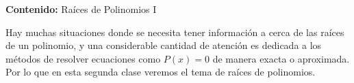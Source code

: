 {\Large\textbf{Contenido:} Raíces de Polinomios I}

Hay muchas situaciones donde se necesita tener información a cerca de las raíces de un polinomio, y una considerable cantidad de atención es dedicada a los métodos de resolver ecuaciones como $P(x) = 0$ de manera exacta o aproximada.
Por lo que en esta segunda clase veremos el tema de raíces de polinomios.